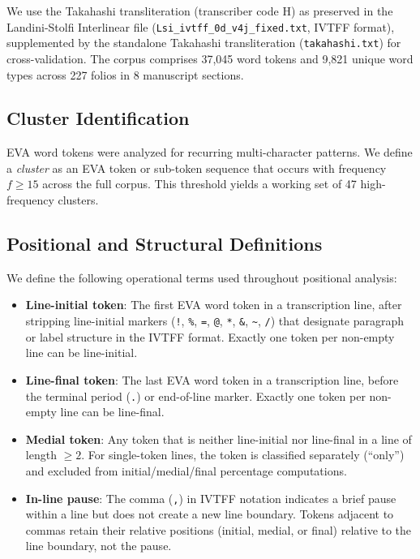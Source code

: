 \documentclass[11pt,a4paper,twocolumn]{article}
\begin{document}
We use the Takahashi transliteration (transcriber code H) as preserved in the Landini-Stolfi Interlinear file (\texttt{Lsi\_ivtff\_0d\_v4j\_fixed.txt}, IVTFF format), supplemented by the standalone Takahashi transliteration (\texttt{takahashi.txt}) for cross-validation. The corpus comprises 37,045 word tokens and 9,821 unique word types across 227 folios in 8 manuscript sections.

\subsection{Cluster Identification}

EVA word tokens were analyzed for recurring multi-character patterns. We define a \textit{cluster} as an EVA token or sub-token sequence that occurs with frequency $f \geq 15$ across the full corpus. This threshold yields a working set of 47 high-frequency clusters.

\subsection{Positional and Structural Definitions}
\label{sec:definitions}

We define the following operational terms used throughout positional analysis:

\begin{itemize}[leftmargin=*,itemsep=2pt]
    \item \textbf{Line-initial token}: The first EVA word token in a transcription line, after stripping line-initial markers (\texttt{!}, \texttt{\%}, \texttt{=}, \texttt{@}, \texttt{*}, \texttt{\&}, \texttt{\textasciitilde}, \texttt{/}) that designate paragraph or label structure in the IVTFF format. Exactly one token per non-empty line can be line-initial.
    \item \textbf{Line-final token}: The last EVA word token in a transcription line, before the terminal period (\texttt{.}) or end-of-line marker. Exactly one token per non-empty line can be line-final.
    \item \textbf{Medial token}: Any token that is neither line-initial nor line-final in a line of length $\geq 2$. For single-token lines, the token is classified separately (``only'') and excluded from initial/medial/final percentage computations.
    \item \textbf{In-line pause}: The comma (\texttt{,}) in IVTFF notation indicates a brief pause within a line but does not create a new line boundary. Tokens adjacent to commas retain their relative positions (initial, medial, or final) relative to the line boundary, not the pause.
\end{itemize}
\end{document}
